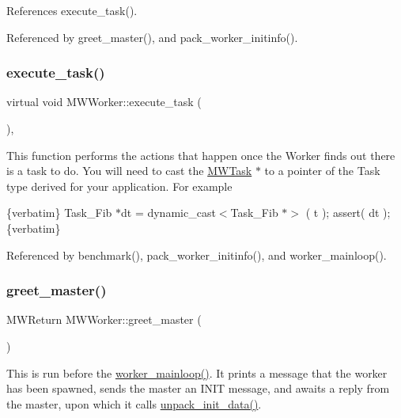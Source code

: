 References execute\+\_\+task().



Referenced by greet\+\_\+master(), and pack\+\_\+worker\+\_\+initinfo().

\mbox{\label{classMWWorker_aa831917347c8f33026a75a5b8df94406}} 
\subsubsection{\texorpdfstring{execute\+\_\+task()}{execute\_task()}}
{\footnotesize\ttfamily virtual void M\+W\+Worker\+::execute\+\_\+task (\begin{DoxyParamCaption}\item[{\hyperlink{classMWTask}{M\+W\+Task} $\ast$}]{ }\end{DoxyParamCaption})\hspace{0.3cm}{\ttfamily [protected]}, {}}

This function performs the actions that happen once the Worker finds out there is a task to do. You will need to cast the \hyperlink{classMWTask}{M\+W\+Task} $\ast$ to a pointer of the Task type derived for your application. For example

\{verbatim\} Task\+\_\+\+Fib $\ast$dt = dynamic\+\_\+cast$<$\+Task\+\_\+\+Fib $\ast$$>$ ( t ); assert( dt ); \{verbatim\} 

Referenced by benchmark(), pack\+\_\+worker\+\_\+initinfo(), and worker\+\_\+mainloop().

\mbox{\label{classMWWorker_a332479873153501e8ecb38cb682cdcd2}} 
\subsubsection{\texorpdfstring{greet\+\_\+master()}{greet\_master()}}
{\footnotesize\ttfamily M\+W\+Return M\+W\+Worker\+::greet\+\_\+master (\begin{DoxyParamCaption}{ }\end{DoxyParamCaption})\hspace{0.3cm}{\ttfamily [protected]}}

This is run before the \hyperlink{classMWWorker_a47f88c7a7c254d215174b77ab14bf5f3}{worker\+\_\+mainloop()}. It prints a message that the worker has been spawned, sends the master an I\+N\+IT message, and awaits a reply from the master, upon which it calls \hyperlink{classMWWorker_a3643c48f110d3f26e4d9aef00569d767}{unpack\+\_\+init\+\_\+data()}. 

